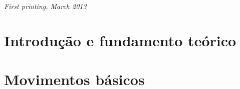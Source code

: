 \documentclass[11pt,fleqn]{book} %
\begin{document}
\noindent \textit{First printing, March 2013} %



\pagestyle{empty} %

\tableofcontents %

\cleardoublepage %

\pagestyle{fancy} %


\part{Introdução e fundamento teórico}










\part{Movimentos básicos}




\end{document}
